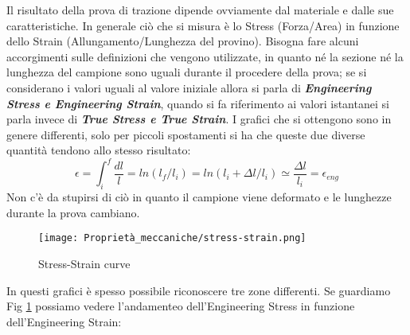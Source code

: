 Il risultato della prova di trazione dipende ovviamente dal materiale e dalle sue caratteristiche. In generale ciò che si misura è lo Stress (Forza/Area) in funzione dello Strain (Allungamento/Lunghezza del provino). Bisogna fare alcuni accorgimenti sulle definizioni che vengono utilizzate, in quanto né la sezione né la lunghezza del campione sono uguali durante il procedere della prova; se si considerano i valori uguali al valore iniziale allora si parla di \textbf{\textit{Engineering Stress e Engineering Strain}}, quando si fa riferimento ai valori istantanei si parla invece di \textbf{\textit{True Stress e True Strain}}. I grafici che si ottengono sono in genere differenti, solo per piccoli spostamenti si ha che queste due diverse quantità tendono allo stesso risultato:
$$\epsilon=\int_i^f\frac{dl}{l}=ln(l_f/l_i)=ln(l_i+\Delta l/l_i)\simeq\frac{\Delta l}{l_i}=\epsilon_{eng}$$
Non c'è da stupirsi di ciò in quanto il campione viene deformato e le lunghezze durante la prova cambiano.
\begin{figure}[h]
    \centering
    \texttt{[image: Proprietà\_meccaniche/stress-strain.png]}
    \caption{Stress-Strain curve}
    \label{stress-strain}
\end{figure}
In questi grafici è spesso possibile riconoscere tre zone differenti. Se guardiamo Fig \ref{stress-strain} possiamo vedere l'andamenteo dell'Engineering Stress in funzione dell'Engineering Strain:
